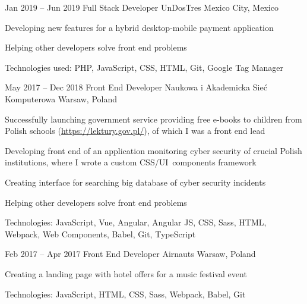\begin{sectionlist}

    \sectionlistitemjob
        {Jan 2019 -- Jun 2019}
        {Full Stack Developer}
        {UnDosTres}
        {Mexico City, Mexico}
        {
            \begin{joblisting}
                \item Developing new features for a hybrid desktop-mobile
                    payment application
                \item Helping other developers solve front end problems
                \item Technologies used: PHP, JavaScript, CSS, HTML, Git,
                    Google Tag Manager
            \end{joblisting}
        }

    \sectionlistitemjob
        {May 2017 -- Dec 2018}
        {Front End Developer}
        {Naukowa i Akademicka Sie\'{c} Kom\-pu\-te\-ro\-wa \hfill \linebreak}
        {Warsaw, Poland}
        {
            \begin{joblisting}
                \item Successfully launching government service providing free
                    e-books to children from Polish schools
                    (\url{https://lektury.gov.pl/}), of which I was a front end
                    lead
                \item Developing front end of an application monitoring
                    cyber security of crucial Polish institutions,
                    where I wrote a custom CSS/UI~components framework
                \item Creating interface for searching big database of cyber
                    security incidents
                \item Helping other developers solve front end problems
                \item Technologies: JavaScript, Vue, Angular, Angular JS,
                    CSS, Sass, HTML, Webpack, Web Components, Babel, Git,
                    TypeScript
            \end{joblisting}
        }

    \sectionlistitemjob
        {Feb 2017 -- Apr 2017}
        {Front End Developer}
        {Airnauts}
        {Warsaw, Poland}
        {
            \begin{joblisting}
                \item Creating a landing page with hotel offers for a music
                    festival event
                \item Technologies: JavaScript, HTML, CSS, Sass, Webpack,
                    Babel, Git
            \end{joblisting}
        }


\end{sectionlist}
